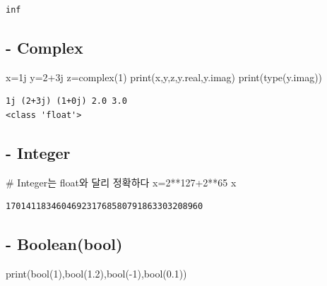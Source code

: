 \documentclass[
  letterpaper,
  DIV=11,
  numbers=noendperiod]{scrreprt}
\newenvironment{Shaded}{\begin{snugshade}}{\end{snugshade}}
\newcommand{\BuiltInTok}[1]{\textcolor[rgb]{0.00,0.23,0.31}{#1}}
\newcommand{\CommentTok}[1]{\textcolor[rgb]{0.37,0.37,0.37}{#1}}
\newcommand{\DecValTok}[1]{\textcolor[rgb]{0.68,0.00,0.00}{#1}}
\newcommand{\FloatTok}[1]{\textcolor[rgb]{0.68,0.00,0.00}{#1}}
\newcommand{\NormalTok}[1]{\textcolor[rgb]{0.00,0.23,0.31}{#1}}
\newcommand{\OperatorTok}[1]{\textcolor[rgb]{0.37,0.37,0.37}{#1}}
\newcommand{\OtherTok}[1]{\textcolor[rgb]{0.00,0.23,0.31}{#1}}
\begin{document}
\begin{verbatim}
inf
\end{verbatim}

\subsection{- Complex}\label{complex}

\begin{Shaded}
\begin{Highlighting}[]
\NormalTok{x}\OperatorTok{=}\OtherTok{1j}
\NormalTok{y}\OperatorTok{=}\DecValTok{2}\OperatorTok{+}\OtherTok{3j}
\NormalTok{z}\OperatorTok{=}\BuiltInTok{complex}\NormalTok{(}\DecValTok{1}\NormalTok{)}
\BuiltInTok{print}\NormalTok{(x,y,z,y.real,y.imag)}
\BuiltInTok{print}\NormalTok{(}\BuiltInTok{type}\NormalTok{(y.imag))}
\end{Highlighting}
\end{Shaded}

\begin{verbatim}
1j (2+3j) (1+0j) 2.0 3.0
<class 'float'>
\end{verbatim}

\subsection{- Integer}\label{integer}

\begin{Shaded}
\begin{Highlighting}[]
\CommentTok{\# Integer는 float와 달리 정확하다}
\NormalTok{x}\OperatorTok{=}\DecValTok{2}\OperatorTok{**}\DecValTok{127}\OperatorTok{+}\DecValTok{2}\OperatorTok{**}\DecValTok{65} 
\NormalTok{x}
\end{Highlighting}
\end{Shaded}

\begin{verbatim}
170141183460469231768580791863303208960
\end{verbatim}

\subsection{- Boolean(bool)}\label{booleanbool}

\begin{Shaded}
\begin{Highlighting}[]
\BuiltInTok{print}\NormalTok{(}\BuiltInTok{bool}\NormalTok{(}\DecValTok{1}\NormalTok{),}\BuiltInTok{bool}\NormalTok{(}\FloatTok{1.2}\NormalTok{),}\BuiltInTok{bool}\NormalTok{(}\OperatorTok{{-}}\DecValTok{1}\NormalTok{),}\BuiltInTok{bool}\NormalTok{(}\FloatTok{0.1}\NormalTok{))}
\end{Highlighting}
\end{Shaded}
\end{document}
